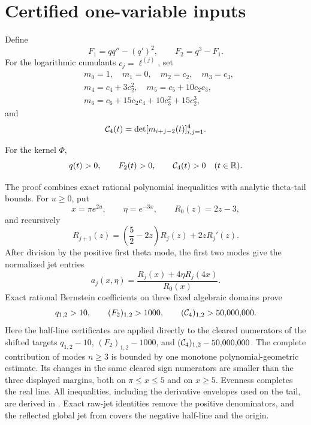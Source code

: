 \section{Certified one-variable inputs}\label{sec:inputs}

Define
\[
 F_1=qq''-(q')^2,\qquad F_2=q^3-F_1.
\]
For the logarithmic cumulants \(c_j=\ell^{(j)}\), set
\[
\begin{aligned}
 &m_0=1,\quad m_1=0,\quad m_2=c_2,\quad m_3=c_3,\\
 &m_4=c_4+3c_2^2,\quad m_5=c_5+10c_2c_3,\\
 &m_6=c_6+15c_2c_4+10c_3^2+15c_2^3,
\end{aligned}
\]
and
\begin{equation}\label{eq:C4-def}
 \mathcal{C}_4(t)=\det[m_{i+j-2}(t)]_{i,j=1}^4.
\end{equation}

\begin{lemma}\label{lem:certified-input}
For the kernel \(\Phi\),
\[
 q(t)>0,\qquad F_2(t)>0,\qquad \mathcal{C}_4(t)>0
 \quad(t\in\mathbb{R}).
\]
\end{lemma}

The proof combines exact rational polynomial inequalities with analytic
theta-tail bounds. For \(u\geq0\), put
\[
 x=\pi e^{2u},\qquad \eta=e^{-3x},\qquad R_0(z)=2z-3,
\]
and recursively
\[
 R_{j+1}(z)=\left(\frac52-2z\right)R_j(z)+2zR_j'(z).
\]
After division by the positive first theta mode, the first two modes give the
normalized jet entries
\[
 a_j(x,\eta)=\frac{R_j(x)+4\eta R_j(4x)}{R_0(x)}.
\]
Exact rational Bernstein coefficients on three fixed algebraic domains prove
\[
 q_{1,2}>10,\qquad (F_2)_{1,2}>1000,
 \qquad (\mathcal{C}_4)_{1,2}>50{,}000{,}000.
\]
Here the half-line certificates are applied directly to the cleared
numerators of the shifted targets \(q_{1,2}-10\),
\((F_2)_{1,2}-1000\), and
\((\mathcal{C}_4)_{1,2}-50{,}000{,}000\). The complete contribution of modes
\(n\geq3\) is bounded by one monotone polynomial-geometric estimate. Its
changes in the same cleared sign numerators are smaller than the three
displayed margins, both on
\(\pi\leq x\leq5\) and on \(x\geq5\). Evenness completes the real line.
All inequalities, including the derivative envelopes used on the tail, are
derived in . Exact raw-jet identities remove the positive
denominators, and the reflected global jet from  covers the
negative half-line and the origin.
